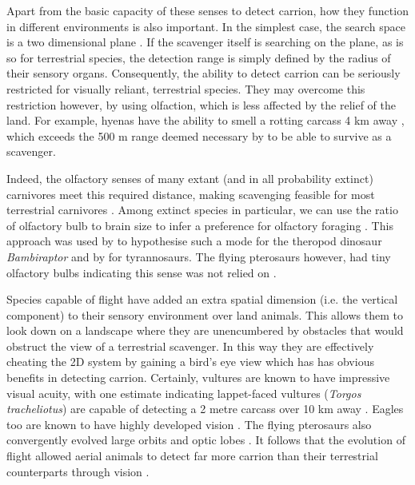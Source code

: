 \documentclass[a4paper,12pt]{article}
\begin{document}
Apart from the basic capacity of these senses to detect carrion, how they function in different environments is also important. 
In the simplest case, the search space is a two dimensional plane \citep{pawar2012dimensionality}. 
If the scavenger itself is searching on the plane, as is so for terrestrial species, the detection range is simply defined by the radius of their sensory organs.
Consequently, the ability to detect carrion can be seriously restricted for visually reliant, terrestrial species. 
They may overcome this restriction however, by using olfaction, which is less affected by the relief of the land.
For example, hyenas have the ability to smell a rotting carcass 4 km away \citep{mills1989comparative}, which exceeds the 500 m range deemed necessary by \cite{ruxton2004obligate} to be able to survive as a scavenger. 

Indeed, the olfactory senses of many extant (and in all probability extinct) carnivores meet this required distance, making scavenging feasible for most terrestrial carnivores \citep{farlow1994speculations,mech2010wolves}. 
Among extinct species in particular, we can use the ratio of olfactory bulb to brain size to infer a preference for olfactory foraging \citep{zelenitsky2011evolution}.
This approach was used by \cite{zelenitsky2011evolution} to hypothesise such a mode for the theropod dinosaur \textit{Bambiraptor} and by \cite{witmer2009new} for tyrannosaurs.
The flying pterosaurs however, had tiny olfactory bulbs indicating this sense was not relied on \citep{witton2013pterosaurs}.

Species capable of flight have added an extra spatial dimension (i.e. the vertical component) to their sensory environment over land animals.
This allows them to look down on a landscape where they are unencumbered by obstacles that would obstruct the view of a terrestrial scavenger.
In this way they are effectively cheating the 2D system by gaining a bird's eye view which has has obvious benefits in detecting carrion.
Certainly, vultures are known to have impressive visual acuity, with one estimate indicating lappet-faced vultures (\textit{Torgos tracheliotus}) are capable of detecting a 2 metre carcass over 10 km away \citep{spiegel2013factors}.
Eagles too are known to have highly developed vision \citep{reymond1985spatial}.
The flying pterosaurs also convergently evolved large orbits and optic lobes \citep{witton2013pterosaurs}. 
It follows that the evolution of flight allowed aerial animals to detect far more carrion than their terrestrial counterparts through vision \citep{AR:AR22815}.
\end{document}
